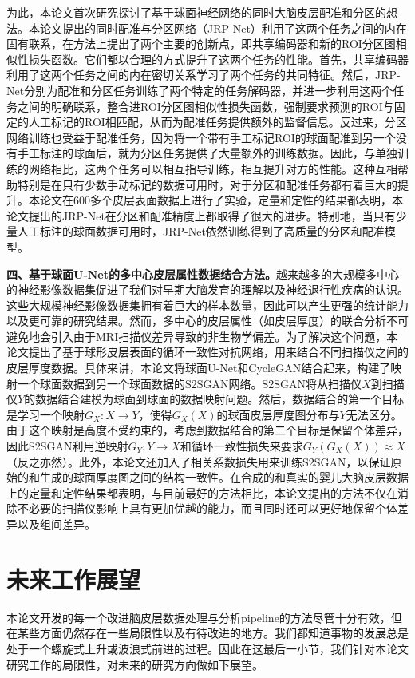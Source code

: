 为此，本论文首次研究探讨了基于球面神经网络的同时大脑皮层配准和分区的想法。本论文提出的同时配准与分区网络（JRP-Net）利用了这两个任务之间的内在固有联系，在方法上提出了两个主要的创新点，即共享编码器和新的ROI分区图相似性损失函数。它们都以合理的方式提升了这两个任务的性能。首先，共享编码器利用了这两个任务之间的内在密切关系学习了两个任务的共同特征。然后，JRP-Net分别为配准和分区任务训练了两个特定的任务解码器，并进一步利用这两个任务之间的明确联系，整合进ROI分区图相似性损失函数，强制要求预测的ROI与固定的人工标记的ROI相匹配，从而为配准任务提供额外的监督信息。反过来，分区网络训练也受益于配准任务，因为将一个带有手工标记ROI的球面配准到另一个没有手工标注的球面后，就为分区任务提供了大量额外的训练数据。因此，与单独训练的网络相比，这两个任务可以相互指导训练，相互提升对方的性能。这种互相帮助特别是在只有少数手动标记的数据可用时，对于分区和配准任务都有着巨大的提升。本论文在600多个皮层表面数据上进行了实验，定量和定性的结果都表明，本论文提出的JRP-Net在分区和配准精度上都取得了很大的进步。特别地，当只有少量人工标注的球面数据可用时，JRP-Net依然训练得到了高质量的分区和配准模型。

\textbf{四、基于球面U-Net的多中心皮层属性数据结合方法。}越来越多的大规模多中心的神经影像数据集促进了我们对早期大脑发育的理解以及神经退行性疾病的认识。这些大规模神经影像数据集拥有着巨大的样本数量，因此可以产生更强的统计能力以及更可靠的研究结果。然而，多中心的皮层属性（如皮层厚度）的联合分析不可避免地会引入由于MRI扫描仪差异导致的非生物学偏差。为了解决这个问题，本论文提出了基于球形皮层表面的循环一致性对抗网络，用来结合不同扫描仪之间的皮层厚度数据。具体来讲，本论文将球面U-Net和CycleGAN结合起来，构建了映射一个球面数据到另一个球面数据的S2SGAN网络。S2SGAN将从扫描仪$X$到扫描仪$Y$的数据结合建模为球面到球面的数据映射问题。然后，数据结合的第一个目标是学习一个映射$G_X:X\rightarrow Y$，使得$G_X(X)$的球面皮层厚度图分布与$Y$无法区分。由于这个映射是高度不受约束的，考虑到数据结合的第二个目标是保留个体差异，因此S2SGAN利用逆映射$G_Y:Y\rightarrow X$和循环一致性损失来要求$G_Y(G_X(X))\approx X$（反之亦然）。此外，本论文还加入了相关系数损失用来训练S2SGAN，以保证原始的和生成的球面厚度图之间的结构一致性。在合成的和真实的婴儿大脑皮层数据上的定量和定性结果都表明，与目前最好的方法相比，本论文提出的方法不仅在消除不必要的扫描仪影响上具有更加优越的能力，而且同时还可以更好地保留个体差异以及组间差异。


\section{未来工作展望}
本论文开发的每一个改进脑皮层数据处理与分析pipeline的方法尽管十分有效，但在某些方面仍然存在一些局限性以及有待改进的地方。我们都知道事物的发展总是处于一个螺旋式上升或波浪式前进的过程。因此在这最后一小节，我们针对本论文研究工作的局限性，对未来的研究方向做如下展望。

